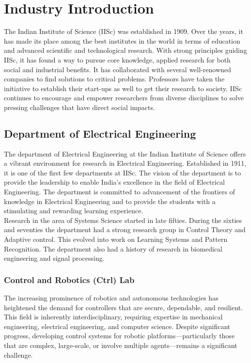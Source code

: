 \chapter{Industry Introduction}
\label{ch:industry} 

\noindent
The Indian Institute of Science (IISc) was established in 1909. Over the years, it has made its place among the best institutes in the world in terms of education and advanced scientific and technological research. With strong principles guiding IISc, it has found a way to pursue core knowledge, applied research for both social and industrial benefits. It has collaborated with several well-renowned companies to find solutions to critical problems. Professors have taken the initiative to establish their start-ups as well to get their research to society. IISc continues to encourage and empower researchers from diverse disciplines to solve pressing challenges that have direct social impacts. \\

\section{Department of Electrical Engineering}
The department of Electrical Engineering at the Indian Institute of Science offers a vibrant environment for research in Electrical Engineering. Established in 1911, it is one of the first few departments at IISc. The vision of the department is to provide the leadership to enable India’s excellence in the field of Electrical Engineering. The department is committed to advancement of the frontiers of knowledge in Electrical Engineering and to provide the students with a stimulating and rewarding learning experience.\\

\noindent
Research in the area of Systems Science started in late fifties. During the sixties and seventies the department had a strong research group in Control Theory and Adaptive control. This evolved into work on Learning Systems and Pattern Recognition. The department also had a history of research in biomedical engineering and signal processing. \\

\subsection{Control and Robotics (Ctrl) Lab}
\noindent The increasing prominence of robotics and autonomous technologies has heightened the demand for controllers that are secure, dependable, and resilient. This field is inherently interdisciplinary, requiring expertise in mechanical engineering, electrical engineering, and computer science. Despite significant progress, developing control systems for robotic platforms—particularly those that are complex, large-scale, or involve multiple agents—remains a significant challenge. \\

